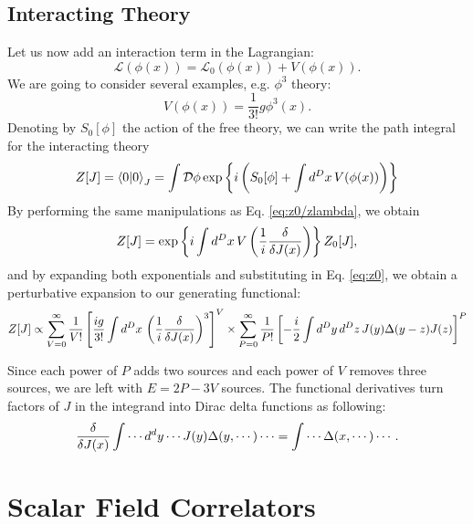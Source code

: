 \documentclass{article}
\numberwithin{equation}{section}
\begin{document}
\subsection{Interacting Theory}
Let us now add an interaction term in the Lagrangian:
\begin{equation}
    \mathcal{L}(\phi(x)) = \mathcal{L}_0(\phi(x)) + V(\phi(x)).
\end{equation}
We are going to consider several examples, e.g. $\phi^3$ theory:
\begin{equation}
    V(\phi(x)) = \frac{1}{3!}g \phi^3(x).
\end{equation}
Denoting by $S_0[\phi]$ the action of the free theory, we can write the path integral for the interacting theory
\begin{equation}
    Z[J] = \braket{0}{0}_J = \int \mathcal{D}\phi \exp\left\{i\left(S_0[\phi] + \int d^Dx \, V(\phi(x))\right)\right\}
\end{equation}
By performing the same manipulations as Eq. \ref{eq:z0/zlambda}, we obtain
\begin{equation}
    Z[J] = \exp\left\{i \int d^Dx \, V\left(\frac{1}{i}\fdv{J(x)}\right)\right\} Z_0[J],
\end{equation}
and by expanding both exponentials and substituting in Eq. \ref{eq:z0}, we obtain a perturbative expansion to our generating functional:
\begin{equation}
    Z[J] \propto \sum_{V=0}^\infty \frac{1}{V!} \left[\frac{ig}{3!} \int d^Dx \, \left(\frac{1}{i}\fdv{J(x)}\right)^3\right]^V \times \sum_{P=0}^\infty \frac{1}{P!} \left[-\frac{i}{2} \int d^Dy \, d^Dz \, J(y) \Delta(y-z)J(z)\right]^P
\end{equation}

Since each power of $P$ adds two sources and each power of $V$ removes three sources, we are left with $E=2P-3V$ sources. The functional derivatives turn factors of $J$ in the integrand into Dirac delta functions as following:
\begin{equation}
    \fdv{J(x)}\int \cdots d^dy \cdots J(y)\Delta(y, \cdots) \cdots = \int \cdots \Delta(x, \cdots) \cdots .
\end{equation}

\section{Scalar Field Correlators}
\end{document}
